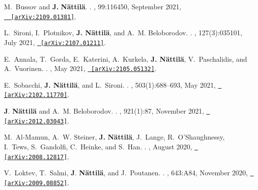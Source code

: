 \documentclass[letterpaper, onecolumn, 11pt]{article}
\begin{document}
\begin{thebibliography}{10}
M.~{Bussov} and \textbf{J.} {\textbf{N{\"a}ttil{\"a}}}.
.
, 99:116450, September
  2021, \href{http://arxiv.org/abs/2109.01381}{\nolinkurl{
  [arXiv:2109.01381]}}.

L.~{Sironi}, I.~{Plotnikov}, \textbf{J. {N{\"a}ttil{\"a}}}, and A.~M.
  {Beloborodov}.
.
\newblock {\em \prl}, 127(3):035101, July 2021,
  \href{http://arxiv.org/abs/2107.01211}{\nolinkurl{ [arXiv:2107.01211]}}.

E.~{Annala}, T.~{Gorda}, E.~{Katerini}, A.~{Kurkela}, \textbf{J.
  {N{\"a}ttil{\"a}}}, V.~{Paschalidis}, and A.~{Vuorinen}.
.
, May 2021,
  \href{http://arxiv.org/abs/2105.05132}{\nolinkurl{ [arXiv:2105.05132]}}.

E.~{Sobacchi}, \textbf{J. {N{\"a}ttil{\"a}}}, and L.~{Sironi}.
.
\newblock {\em \mnras}, 503(1):688--693, May 2021,
  \href{http://arxiv.org/abs/2102.11770}{\nolinkurl{ [arXiv:2102.11770]}}.

\textbf{J}. \textbf{N{\"a}ttil{\"a}} and A.~M. {Beloborodov}.
.
\newblock {\em \apj}, 921(1):87, November 2021,
  \href{http://arxiv.org/abs/2012.03043}{\nolinkurl{ [arXiv:2012.03043]}}.

M.~{Al-Mamun}, A.~W. {Steiner}, \textbf{J.} \textbf{N{\"a}ttil{\"a}},
  J.~{Lange}, R.~{O'Shaughnessy}, I.~{Tews}, S.~{Gandolfi}, C.~{Heinke}, and
  S.~{Han}.
.
\newblock {\em \prl}, August 2020,
  \href{http://arxiv.org/abs/2008.12817}{\nolinkurl{ [arXiv:2008.12817]}}.

V.~{Loktev}, T.~{Salmi}, \textbf{J}. \textbf{N{\"a}ttil{\"a}}, and
  J.~{Poutanen}.
.
\newblock {\em \aap}, 643:A84, November 2020,
  \href{http://arxiv.org/abs/2009.08852}{\nolinkurl{ [arXiv:2009.08852]}}.


\end{thebibliography}
\end{document}
